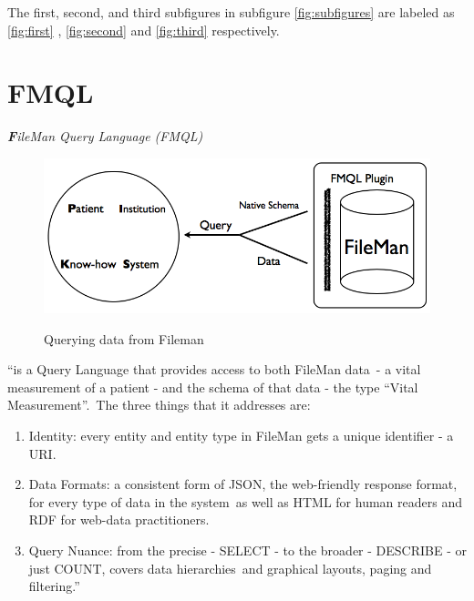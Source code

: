 \documentclass[DIV=calc, paper=a4, fontsize=12pt, onecolumn]{scrartcl}	 %
\newcommand{\initial}[1]{ %
\lettrine[lines=3,lhang=0.3,nindent=0em,slope=0em]{
\color{DarkBlue}
{\textbf{\textit{#1}}}}{}}
\begin{document}
The first, second, and third subfigures in subfigure
\ref{fig:subfigures} are labeled as
\ref{fig:first} \cite{stenzhorn2008simplifying}, \ref{fig:second} \cite{stenzhorn2008simplifying} and \ref{fig:third}  \cite{parachuri2008role}
respectively.



\section[FileMan Query Language (FMQL)]{FMQL}
  \label{sec:fmql}

\initial{F}\textit{ileMan Query Language (FMQL)}\

  \begin{figure}[ht!]
    \centering
   \includegraphics[scale=0.4]{fmqlFromFileMan.png}
    \caption{Querying data from Fileman}
    \cite[Fig.~1]{belleau_bio2rdf:_2008}
    \label{fig:fmql}
  \end{figure}  

``is a Query Language that provides access to both FileMan data\
- a vital measurement of a patient - and the schema of that data - the type ``Vital Measurement''.\
The three things that it addresses are:
\begin{enumerate}
\item
Identity: every entity and entity type in FileMan gets a unique identifier - a URI.
\item
Data Formats: a consistent form of JSON, the web-friendly response format, for every type of data in the system\
 as well as HTML for human readers and RDF for web-data practitioners.
\item
Query Nuance: from the precise - SELECT - to the broader - DESCRIBE - or just COUNT, covers data hierarchies\
 and graphical layouts, paging and filtering.''
\end{enumerate}
\end{document}

